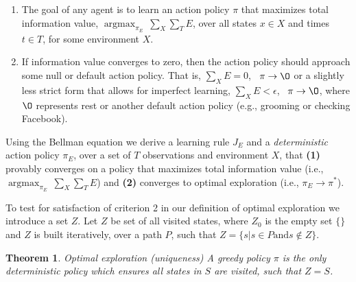 \documentclass[9pt,twocolumn,twoside]{pnas-new}
\DeclareMathOperator*{\argmax}{argmax}
\newtheorem{theorem}{Theorem}
\begin{document}
\begin{enumerate}[noitemsep,wide=0pt,leftmargin=\dimexpr\labelwidth+2\labelsep\relax]
    \item The goal of any agent is to learn an action policy $\pi$ that maximizes total information value, $\argmax_{\pi_E} \ \sum_X \sum_T E$, over all states $x \in X$ and times $t \in T$, for some environment $X$.
    \item If information value converges to zero, then the action policy should approach some null or default action policy. That is, $\sum_X E = 0$, \ $\pi \rightarrow \O$ or a slightly less strict form that allows for imperfect learning, $\sum_X E < \epsilon $, \ $\pi \rightarrow \O$, where $\O$ represents rest or another default action policy (e.g., grooming or checking Facebook).
\end{enumerate}

Using the Bellman equation we derive a learning rule $J_E$ and a \textit{deterministic} action policy $\pi_E$, over a set of $T$ observations and environment $X$, that \textbf{(1)} provably converges on a policy that maximizes total information value (i.e., $\argmax_{\pi_E} \ \sum_X \sum_T E$) and \textbf{(2)} converges to optimal exploration (i.e., $\pi_E \rightarrow \pi^*$).

To test for satisfaction of criterion 2 in our definition of optimal exploration we introduce a set $Z$. Let $Z$ be set of all visited states, where $Z_0$ is the empty set $\{\}$ and $Z$ is built iteratively, over a path $P$, such that $Z = \{s | s \in P \text{and} s \not\in Z\}$.

\begin{theorem}{Optimal exploration (uniqueness)}
A greedy policy $\pi$ is the only deterministic policy which ensures all states in $S$ are visited, such that $Z = S$.
\end{theorem}
\end{document}
